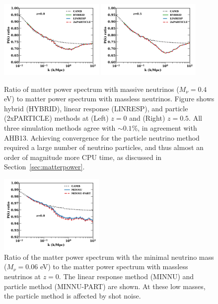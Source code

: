\documentclass[useAMS, usenatbib]{mnras}
\begin{document}
\begin{figure}
\includegraphics[width=0.45\textwidth]{nuplots/pks_rel-10.pdf}
\includegraphics[width=0.45\textwidth]{nuplots/pks_rel-0_66670.pdf}
  \caption{Ratio of matter power spectrum with massive neutrinos ($M_\nu = 0.4$ eV) to matter power spectrum with massless neutrinos. Figure shows hybrid (HYBRID), linear response (LINRESP), and particle (2xPARTICLE) methods at (Left) $z=0$ and (Right) $z=0.5$. All three simulation methods agree with $\sim 0.1$\%, in agreement with AHB13. Achieving convergence for the particle neutrino method required a large number of neutrino particles, and thus almost an order of magnitude more CPU time, as discussed in Section~\ref{sec:matterpower}.
  }
  \label{fig:matter_power}
\end{figure}

\begin{figure}
\includegraphics[width=0.45\textwidth]{nuplots/pks_lowmass-10.pdf}
\caption{Ratio of the matter power spectrum with the minimal neutrino mass ($M_\nu = 0.06$ eV) to the matter power spectrum with massless neutrinos at $z=0$. The linear response method (MINNU) and particle method (MINNU-PART) are shown. At these low masses, the particle method is affected by shot noise.
}
\label{fig:minimal_mass}
\end{figure}
\end{document}
